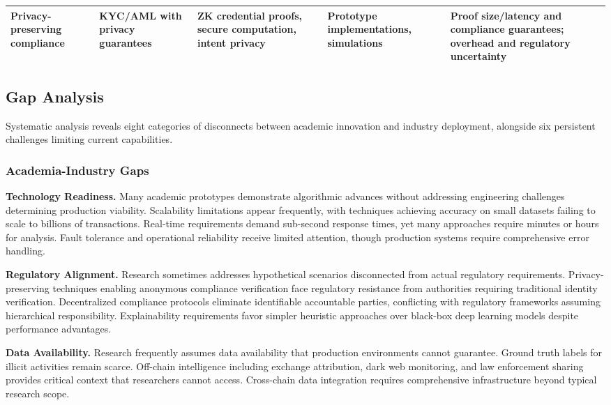 \begin{table}[htbp]
\begin{tabularx}{\textwidth}{XXXXX}
Privacy-preserving compliance \cite{yang2024researchidentitydata,zhang2024blockchainzeroknowledge,wang2024achievingprivacypreservingoptimizer} & KYC/AML with privacy guarantees & ZK credential proofs, secure computation, intent privacy & Prototype implementations, simulations & Proof size/latency and compliance guarantees; overhead and regulatory uncertainty \\
\hline
\end{tabularx}
\end{table}

\subsection{Gap Analysis}

Systematic analysis reveals eight categories of disconnects between academic innovation and industry deployment, alongside six persistent challenges limiting current capabilities.

\subsubsection{Academia-Industry Gaps}

\noindent\textbf{Technology Readiness.} 
Many academic prototypes demonstrate algorithmic advances without addressing engineering challenges determining production viability. Scalability limitations appear frequently, with techniques achieving accuracy on small datasets failing to scale to billions of transactions. Real-time requirements demand sub-second response times, yet many approaches require minutes or hours for analysis. Fault tolerance and operational reliability receive limited attention, though production systems require comprehensive error handling.

\noindent\textbf{Regulatory Alignment.} 
Research sometimes addresses hypothetical scenarios disconnected from actual regulatory requirements. Privacy-preserving techniques enabling anonymous compliance verification face regulatory resistance from authorities requiring traditional identity verification. Decentralized compliance protocols eliminate identifiable accountable parties, conflicting with regulatory frameworks assuming hierarchical responsibility. Explainability requirements favor simpler heuristic approaches over black-box deep learning models despite performance advantages.

\noindent\textbf{Data Availability.} 
Research frequently assumes data availability that production environments cannot guarantee. Ground truth labels for illicit activities remain scarce. Off-chain intelligence including exchange attribution, dark web monitoring, and law enforcement sharing provides critical context that researchers cannot access. Cross-chain data integration requires comprehensive infrastructure beyond typical research scope.


